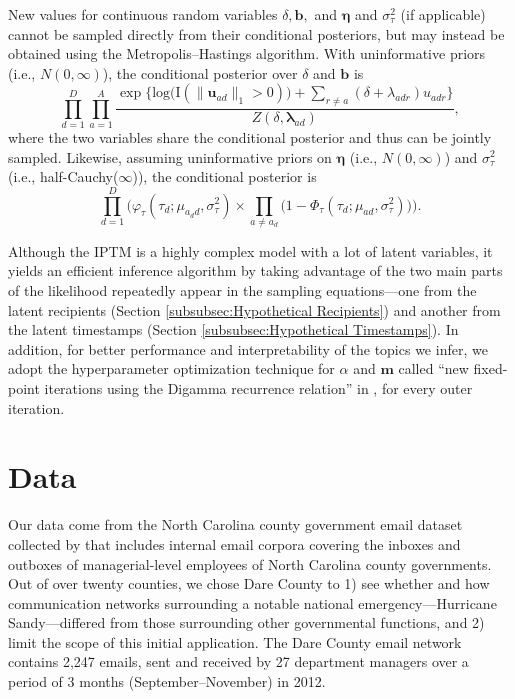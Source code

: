 \documentclass{article}
\begin{document}
  	   New values for continuous random variables $\delta, \boldsymbol{b},$ and $\boldsymbol{\eta}$ and $\sigma^2_\tau$ (if applicable) cannot be sampled directly from their conditional posteriors, but may instead be obtained using the Metropolis--Hastings algorithm. With uninformative priors (i.e., $N({0},\infty)$), the conditional posterior over $\delta$ and $\boldsymbol{b}$ is
  	   \begin{equation}
\prod_{d=1}^D
\prod_{a=1}^A \frac{\exp\Big\{\mbox{log}\big(\text{I}( \lVert \boldsymbol{u}_{ad}\rVert_1 > 0)\big) + \sum\limits_{r \neq a} (\delta+\lambda_{adr})u_{adr}\Big\}}{Z(\delta,\boldsymbol{\lambda}_{ad})},
\end{equation}
where the two variables share the conditional posterior and thus can be jointly sampled. Likewise, assuming uninformative priors on $\boldsymbol{\eta}$ (i.e., $N({0},\infty)$) and $\sigma_{\tau}^2$ (i.e., half-Cauchy($\infty$)), the conditional posterior is
\begin{equation}
\prod_{d=1}^D\Big(\varphi_{\tau}(\tau_{d}; \mu_{a_d d}, \sigma_\tau^2)\times \prod_{a\neq a_d}\big(1-\Phi_{\tau}(\tau_{d}; \mu_{a d}, \sigma_\tau^2) \big)\Big).
\end{equation}

Although the IPTM is a highly complex model with a lot of latent variables, it yields an efficient inference algorithm by taking advantage of the two main parts of the likelihood  repeatedly appear in the sampling equations---one from the latent recipients (Section \ref{subsubsec:Hypothetical Recipients}) and another from the latent timestamps (Section \ref{subsubsec:Hypothetical Timestamps}). In addition, for better performance and interpretability of the topics we infer, we adopt the hyperparameter optimization technique for $\alpha$ and $\boldsymbol{m}$ called ``new fixed-point iterations using the Digamma recurrence relation'' in \cite{wallach2008structured}, for every outer iteration. 

\section{Data}\label{sec:Data}
Our data come from the North Carolina county government email dataset collected by \cite{ben2017transparency} that includes internal email corpora covering the inboxes and outboxes of managerial-level employees of North Carolina county governments. Out of over twenty counties, we chose Dare County to 1) see whether and how communication networks surrounding a notable national emergency---Hurricane Sandy---differed from those surrounding other governmental functions, and 2) limit the scope of this initial application. The Dare County email network contains 2,247 emails, sent and received by 27 department managers over a period of 3 months (September--November) in 2012. 
\end{document}
